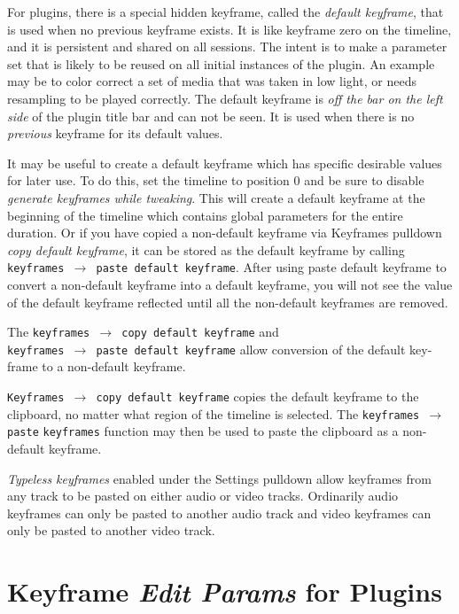 For plugins, there is a special hidden keyframe, called the \textit{default keyframe}, that is used when no previous keyframe exists.  It is like keyframe zero on the timeline, and it is persistent and shared on
all sessions.  The intent is to make a parameter set that is likely to be reused on all initial instances of the plugin.  An example may be to color correct a set of media that was taken in low light, or needs resampling to be played correctly.  The default keyframe is \textit{off the bar on the left side} of the plugin title bar and can not be seen.  It is used when there is no \textit{previous} keyframe for its default values.

It may be useful to create a default keyframe which has specific desirable values for later use.  To do this, set the timeline to position 0 and be sure to disable \textit{generate keyframes while tweaking}.  This will create a default keyframe at the beginning of the timeline which contains global parameters for the entire duration.  Or if you have copied a non-default keyframe via Keyframes pulldown \textit{copy default keyframe}, it can be stored as the default keyframe by calling \texttt{keyframes $\rightarrow$ paste default keyframe}.  After using paste default keyframe to convert a non-default keyframe into a default keyframe, you will not see the value of the default keyframe reflected until all the non-default keyframes are removed.

The \texttt{keyframes $\rightarrow$ copy default keyframe} and \\
\texttt{keyframes $\rightarrow$ paste default keyframe} allow conversion of the default key-frame to a non-default keyframe.

\texttt{Keyframes $\rightarrow$ copy default keyframe} copies the default keyframe to the clipboard, no matter what region of the timeline is selected.
The \texttt{keyframes $\rightarrow$ paste} \texttt{keyframes} function may then be used to paste the clipboard as a non-default keyframe.

\textit{Typeless keyframes} enabled under the Settings pulldown allow keyframes from any track to be pasted on either audio or video tracks.  Ordinarily audio keyframes can only be pasted to another audio track and video keyframes can only be pasted to another video track.

\section{Keyframe \textit{Edit Params} for Plugins}%
\label{sec:keyframe_edit_params_plugin}

